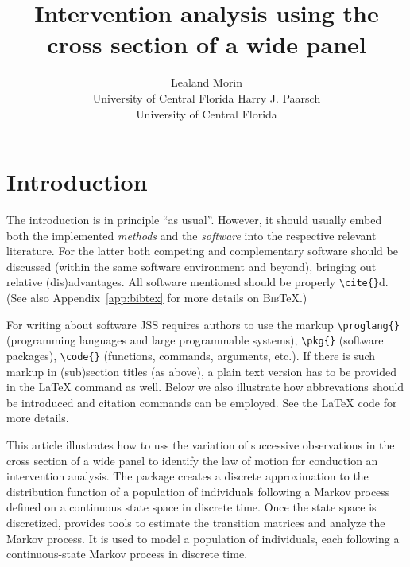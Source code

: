 \documentclass[article]{jss}
\author{Lealand Morin\\University of Central Florida
   \And Harry J. Paarsch\\University of Central Florida}
\title{Intervention analysis using the cross section of a wide panel}
\begin{document}



\section[Introduction]{Introduction} \label{sec:intro}


\begin{leftbar}
The introduction is in principle ``as usual''. However, it should usually embed
both the implemented \emph{methods} and the \emph{software} into the respective
relevant literature. For the latter both competing and complementary software
should be discussed (within the same software environment and beyond), bringing
out relative (dis)advantages. All software mentioned should be properly
\verb|\cite{}|d. (See also Appendix~\ref{app:bibtex} for more details on
\textsc{Bib}{\TeX}.)

For writing about software JSS requires authors to use the markup
\verb|\proglang{}| (programming languages and large programmable systems),
\verb|\pkg{}| (software packages), \verb|\code{}| (functions, commands,
arguments, etc.). If there is such markup in (sub)section titles (as above), a
plain text version has to be provided in the {\LaTeX} command as well. Below we
also illustrate how abbrevations should be introduced and citation commands can
be employed. See the {\LaTeX} code for more details.
\end{leftbar}


This article illustrates how to
uss the variation of successive observations in the
    cross section of a wide panel to identify the law of motion 
    for conduction an intervention analysis.
The  package creates a discrete approximation to
the distribution function of a population of individuals following 
   a Markov  process defined on a continuous state space in discrete time.
  Once the state space is discretized,  provides tools
  to estimate the transition matrices and analyze the Markov process.
  It is used to model a population of individuals, each following a  
  continuous-state Markov process in discrete time.
% 
\end{document}
